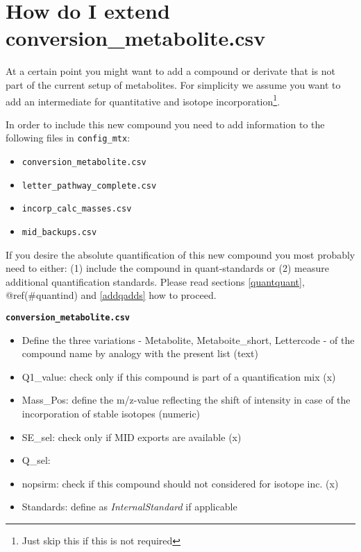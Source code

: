 \documentclass[]{book}
\providecommand{\tightlist}{%
  \setlength{\itemsep}{0pt}\setlength{\parskip}{0pt}}
\let\rmarkdownfootnote\footnote%
\def\footnote{\protect\rmarkdownfootnote}
\begin{document}
\hypertarget{extendconse}{%
\section{How do I extend conversion\_metabolite.csv}\label{extendconse}}

At a certain point you might want to add a compound or derivate that is not part of the current setup of metabolites. For simplicity we assume you want to add an intermediate for quantitative and isotope incorporation\footnote{Just skip this if this is not required}.

In order to include this new compound you need to add information to the following files in \texttt{config\_mtx}:

\begin{itemize}
\tightlist
\item
  \texttt{conversion\_metabolite.csv}
\item
  \texttt{letter\_pathway\_complete.csv}
\item
  \texttt{incorp\_calc\_masses.csv}
\item
  \texttt{mid\_backups.csv}
\end{itemize}

If you desire the absolute quantification of this new compound you most probably need to either: (1) include the compound in quant-standards or (2) measure additional quantification standards. Please read sections \ref{quantquant}, @ref(\#quantind) and \ref{addqadds} how to proceed.

\textbf{\texttt{conversion\_metabolite.csv}}

\begin{itemize}
\tightlist
\item
  Define the three variations - Metabolite, Metaboite\_short, Lettercode - of the compound name by analogy with the present list (text)
\item
  Q1\_value: check only if this compound is part of a quantification mix (x)
\item
  Mass\_Pos: define the m/z-value reflecting the shift of intensity in case of the incorporation of stable isotopes (numeric)
\item
  SE\_sel: check only if MID exports are available (x)
\item
  Q\_sel:
\item
  nopsirm: check if this compound should not considered for isotope inc. (x)
\item
  Standards: define as \emph{InternalStandard} if applicable
\end{itemize}
\end{document}
